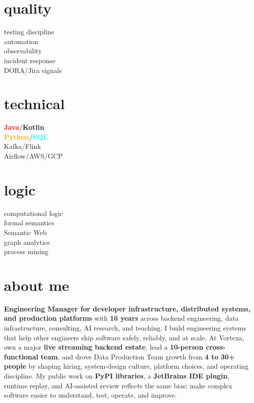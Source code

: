\documentclass[]{../../../../friggeri-cv}
\begin{document}
\begin{aside}
    \section{quality}
        {\footnotesize testing discipline\\automation\\observability\\incident response\\DORA/Jira signals}
    \section{technical}
        {\footnotesize \textbf{\textcolor{red}{Java}}/\textbf{\textcolor{red!50!black}{Kotlin}}\\\textbf{\textcolor{orange}{Python}}/\textbf{\textcolor{cyan}{SQL}}\\Kafka/Flink\\Airflow/AWS/GCP}
    \section{logic}
        {\footnotesize computational logic\\formal semantics\\Semantic Web\\graph analytics\\process mining}
\end{aside}

\section{about me}
{\small \textbf{Engineering Manager for developer infrastructure, distributed systems, and production platforms} with \textbf{16 years} across backend engineering, data infrastructure, consulting, AI research, and teaching. I build engineering systems that help other engineers ship software safely, reliably, and at scale. At Vortexa, own a major \textbf{live streaming backend estate}, lead a \textbf{10-person cross-functional team}, and drove Data Production Team growth from \textbf{4 to 30+ people} by shaping hiring, system-design culture, platform choices, and operating discipline. My public work on \textbf{PyPI libraries}, a \textbf{JetBrains IDE plugin}, runtime replay, and AI-assisted review reflects the same bias: make complex software easier to understand, test, operate, and improve.}
\end{document}
